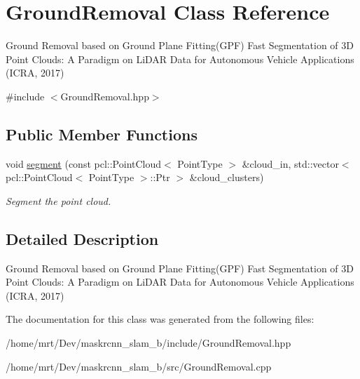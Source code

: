 \hypertarget{classGroundRemoval}{}\section{Ground\+Removal Class Reference}
\label{classGroundRemoval}


Ground Removal based on Ground Plane Fitting(\+G\+P\+F)  Fast Segmentation of 3D Point Clouds\+: A Paradigm on Li\+D\+AR Data for Autonomous Vehicle Applications (I\+C\+RA, 2017)  




{\ttfamily \#include $<$Ground\+Removal.\+hpp$>$}

\subsection*{Public Member Functions}
\begin{DoxyCompactItemize}
\item 
\mbox{\label{classGroundRemoval_a008024a44e6b9ca22647dd930b9a9178}} 
void \hyperlink{classGroundRemoval_a008024a44e6b9ca22647dd930b9a9178}{segment} (const pcl\+::\+Point\+Cloud$<$ Point\+Type $>$ \&cloud\+\_\+in, std\+::vector$<$ pcl\+::\+Point\+Cloud$<$ Point\+Type $>$\+::Ptr $>$ \&cloud\+\_\+clusters)
\begin{DoxyCompactList}\small\item\em Segment the point cloud. \end{DoxyCompactList}\end{DoxyCompactItemize}


\subsection{Detailed Description}
Ground Removal based on Ground Plane Fitting(\+G\+P\+F)  Fast Segmentation of 3D Point Clouds\+: A Paradigm on Li\+D\+AR Data for Autonomous Vehicle Applications (I\+C\+RA, 2017) 

The documentation for this class was generated from the following files\+:\begin{DoxyCompactItemize}
\item 
/home/mrt/\+Dev/maskrcnn\+\_\+slam\+\_\+b/include/Ground\+Removal.\+hpp\item 
/home/mrt/\+Dev/maskrcnn\+\_\+slam\+\_\+b/src/Ground\+Removal.\+cpp\end{DoxyCompactItemize}
